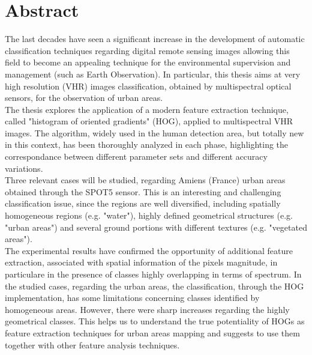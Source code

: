 
\english
\chapter*{Abstract}
{}
The last decades have seen a significant increase in the development of automatic classification techniques regarding digital remote sensing images allowing this field to become an appealing technique for the environmental supervision and management (such as Earth Observation). In particular, this thesis aims at very high resolution (VHR)  images classification, obtained by multispectral optical sensors, for the observation of urban areas.\\
The thesis explores the application of a modern feature extraction technique, called "histogram of oriented gradients" (HOG), applied to multispectral VHR images. The algorithm, widely used in the human detection area, but totally new in this context, has been thoroughly analyzed in each phase, highlighting the correspondance between different parameter sets and different accuracy variations. \\
 Three relevant cases will be studied, regarding Amiens (France) urban areas obtained through the SPOT5 sensor.
This is an interesting and challenging classification issue, since the regions are well diversified, including spatially homogeneous regions (e.g. "water"), highly defined geometrical structures (e.g. "urban areas") and several ground portions with different textures (e.g. "vegetated areas").\\
The experimental results have confirmed the opportunity of additional feature extraction, associated with spatial information of the pixels magnitude, in particulare in the presence of classes highly overlapping in terms of spectrum. In the studied cases, regarding the urban areas, the classification, through the HOG implementation, has some limitations concerning classes identified by homogeneous areas. However, there were sharp increases regarding the highly geometrical classes.
This helps us to understand the true potentiality of HOGs as feature extraction techniques for urban areas mapping and suggests to use them together with other feature analysis techniques.


